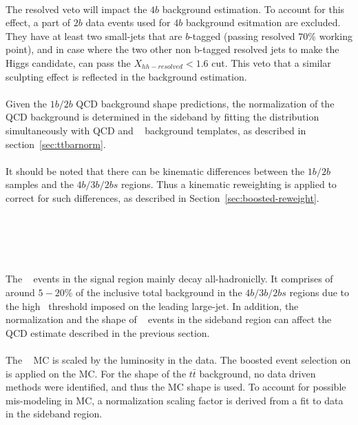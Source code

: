 \paragraph{} 
The resolved veto will impact the $4b$ background estimation. 
To account for this effect, a part of $2b$ data events used for $4b$ background esitmation are excluded. 
They have at least two small-\R jets that are $b$-tagged (passing resolved $70\%$ working point), and in case where the two other non b-tagged resolved jets to make the Higgs candidate, can pass the $X_{hh-resolved} < 1.6$ cut. 
This veto that a similar sculpting effect is reflected in the background estimation.

\paragraph{}
Given the $1b/2b$ QCD background shape predictions, the normalization of the QCD background is determined in the sideband by fitting the \mleadJ distribution simultaneously with QCD and \ttbar~ background templates, as described in section~\ref{sec:ttbarnorm}.

\paragraph{}
It should be noted that there can be kinematic differences between the $1b/2b$ samples and the $4b/3b/2bs$ regions.  Thus a kinematic reweighting is applied to correct for such differences, as described in Section~\ref{sec:boosted-reweight}.


\section{\ttbar~}
\label{sec:boosted-ttbar}

\paragraph{}
The \ttbar~ events in the signal region mainly decay all-hadroniclly.
It comprises of around $5-20$\%  of the inclusive total background in the $4b/3b/2bs$ regions due to the high \pt\ threshold imposed on the leading large-\R jet. 
In addition, the normalization and the shape of \ttbar~ events in the sideband region can affect the QCD estimate described in the previous section.

\paragraph{}
The \ttbar~ MC is scaled by the luminosity in the data.
The boosted event selection on is applied on the MC.
For the shape of the $t\bar{t}$ background, no data driven methods were identified, and thus the MC shape is used.   
To account for possible mis-modeling in MC, a normalization scaling factor is derived from a fit to data in the sideband region.

